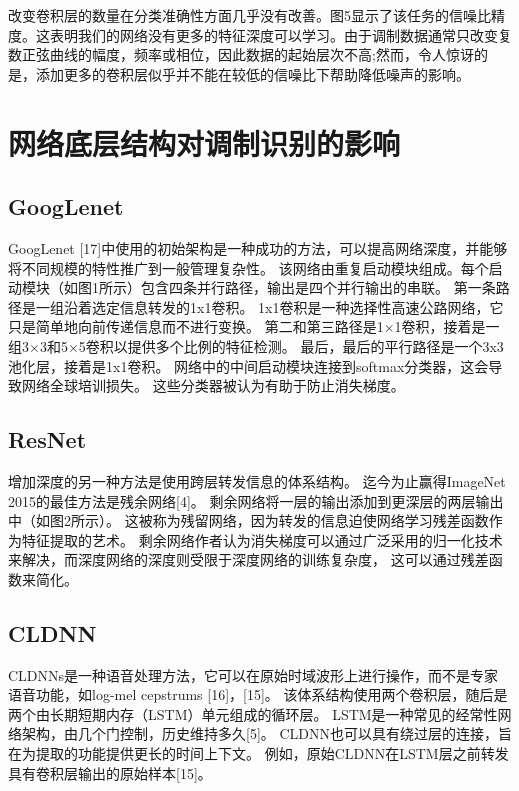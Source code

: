 改变卷积层的数量在分类准确性方面几乎没有改善。图5显示了该任务的信噪比精度。这表明我们的网络没有更多的特征深度可以学习。由于调制数据通常只改变复数正弦曲线的幅度，频率或相位，因此数据的起始层次不高;然而，令人惊讶的是，添加更多的卷积层似乎并不能在较低的信噪比下帮助降低噪声的影响。\par


\section{网络底层结构对调制识别的影响}
\subsection{GoogLenet}
GoogLenet [17]中使用的初始架构是一种成功的方法，可以提高网络深度，并能够将不同规模的特性推广到一般管理复杂性。
该网络由重复启动模块组成。每个启动模块（如图1所示）包含四条并行路径，输出是四个并行输出的串联。
第一条路径是一组沿着选定信息转发的1x1卷积。
1x1卷积是一种选择性高速公路网络，它只是简单地向前传递信息而不进行变换。
第二和第三路径是1×1卷积，接着是一组3×3和5×5卷积以提供多个比例的特征检测。
最后，最后的平行路径是一个3x3池化层，接着是1x1卷积。
网络中的中间启动模块连接到softmax分类器，这会导致网络全球培训损失。
这些分类器被认为有助于防止消失梯度。\par

\subsection{ResNet}
增加深度的另一种方法是使用跨层转发信息的体系结构。
迄今为止赢得ImageNet 2015的最佳方法是残余网络[4]。
剩余网络将一层的输出添加到更深层的两层输出中（如图2所示）。
这被称为残留网络，因为转发的信息迫使网络学习残差函数作为特征提取的艺术。 
剩余网络作者认为消失梯度可以通过广泛采用的归一化技术来解决，而深度网络的深度则受限于深度网络的训练复杂度，
这可以通过残差函数来简化。\par


\subsection{CLDNN}
CLDNNs是一种语音处理方法，它可以在原始时域波形上进行操作，而不是专家语音功能，如log-mel cepstrums [16]，[15]。 该体系结构使用两个卷积层，随后是两个由长期短期内存（LSTM）单元组成的循环层。 LSTM是一种常见的经常性网络架构，由几个门控制，历史维持多久[5]。 CLDNN也可以具有绕过层的连接，旨在为提取的功能提供更长的时间上下文。 例如，原始CLDNN在LSTM层之前转发具有卷积层输出的原始样本[15]。\par

